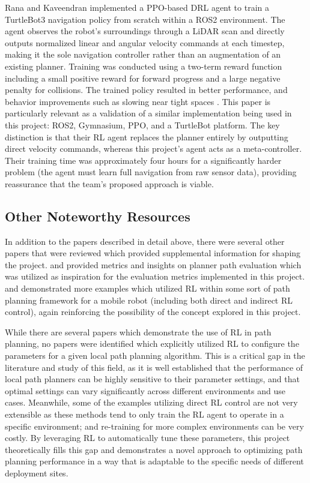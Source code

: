 \documentclass[conference]{IEEEtran}
\begin{document}
        Rana and Kaveendran implemented a PPO-based DRL agent to train a TurtleBot3 navigation policy from scratch within a ROS2 environment. The
        agent observes the robot's surroundings through a LiDAR scan and directly outputs normalized linear and angular velocity commands at each
        timestep, making it the sole navigation controller rather than an augmentation of an existing planner. Training was conducted using a
        two-term reward function including a small positive reward for forward progress and a large negative penalty for collisions. The trained
        policy resulted in better performance, and behavior improvements such as slowing near tight spaces \cite{b10}. This paper is particularly
        relevant as a validation of a similar implementation being used in this project: ROS2, Gymnasium, PPO, and a TurtleBot platform. The key
        distinction is that their RL agent replaces the planner entirely by outputting direct velocity commands, whereas this project's agent acts as
        a meta-controller. Their training time was approximately four hours for a significantly harder problem (the agent must learn full navigation
        from raw sensor data), providing reassurance that the team's proposed approach is viable.

        \subsection{Other Noteworthy Resources}
        In addition to the papers described in detail above, there were several other papers that were reviewed which provided supplemental
        information for shaping the project. \cite{b5} and \cite{b6} provided metrics and insights on planner path evaluation which was utilized as
        inspiration for the evaluation metrics implemented in this project. \cite{b7} and \cite{b8} demonstrated more examples which utilized RL
        within some sort of path planning framework for a mobile robot (including both direct and indirect RL control), again reinforcing the
        possibility of the concept explored in this project.
        
        While there are several papers which demonstrate the use of RL in path planning, no papers were identified which explicitly utilized RL to
        configure the parameters for a given local path planning algorithm. This is a critical gap in the literature and study of this field, as it
        is well established that the performance of local path planners can be highly sensitive to their parameter settings, and that optimal settings
        can vary significantly across different environments and use cases. Meanwhile, some of the examples utilizing direct RL control are not very
        extensible as these methods tend to only train the RL agent to operate in a specific environment; and re-training for more complex
        environments can be very costly. By leveraging RL to automatically tune these parameters, this project theoretically fills this gap and
        demonstrates a novel approach to optimizing path planning performance in a way that is adaptable to the specific needs of different
        deployment sites.
\end{document}
